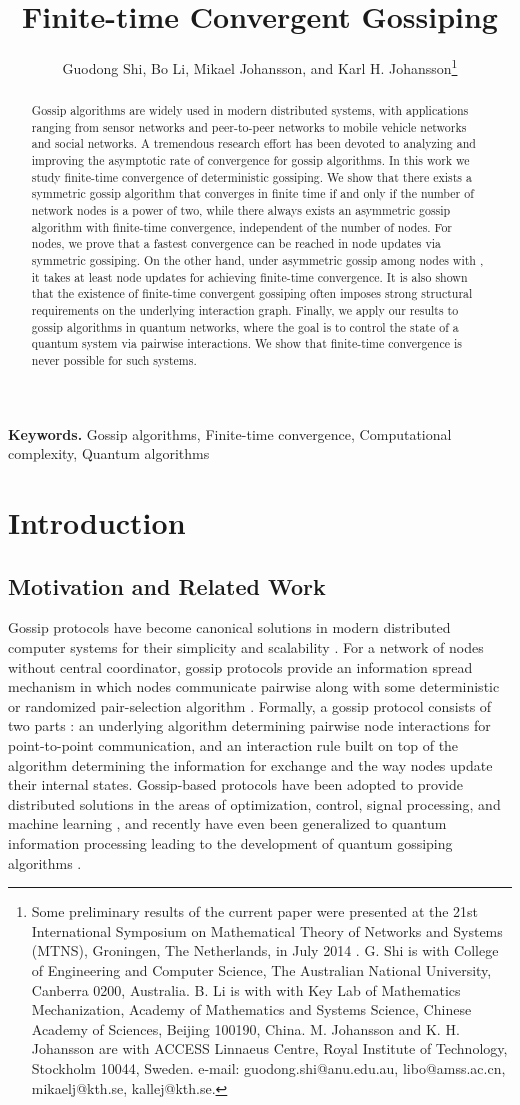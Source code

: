 \documentclass[a4paper, 11pt]{article}
\title{\bf Finite-time Convergent Gossiping}
\date{}
\author{Guodong Shi, Bo Li, Mikael  Johansson,  and Karl H. Johansson\thanks{Some preliminary results of the current paper were presented at the  21st International Symposium on Mathematical Theory of Networks and Systems (MTNS), Groningen, The Netherlands, in July 2014 \cite{MTNS}. G. Shi is with College of Engineering and Computer Science, The Australian National University, Canberra 0200, Australia. B. Li is with with Key Lab of Mathematics Mechanization, Academy of Mathematics and Systems Science, Chinese Academy of Sciences, Beijing 100190, China.   M.  Johansson and K. H. Johansson are with ACCESS Linnaeus Centre, Royal Institute of Technology, Stockholm 10044, Sweden. e-mail: guodong.shi@anu.edu.au, libo@amss.ac.cn, mikaelj@kth.se,  kallej@kth.se. }}
\begin{document}
\maketitle

\begin{abstract}
Gossip algorithms are widely used in modern distributed systems, with applications ranging from sensor networks and peer-to-peer networks to mobile vehicle networks and social networks. A tremendous research effort has been devoted to analyzing and improving the asymptotic rate of convergence for gossip algorithms. In this work we study finite-time convergence of deterministic gossiping. We show that there exists a symmetric gossip algorithm that converges in finite time if and only if the number of network nodes is a power of two, while there always exists an asymmetric gossip algorithm with  finite-time convergence, independent of the number of nodes. For  nodes, we prove that a fastest convergence can be reached in  node updates via symmetric gossiping. On the other hand, under asymmetric gossip among  nodes with , it takes at least  node updates for achieving finite-time convergence. It is also shown that the existence of  finite-time convergent gossiping often imposes strong structural requirements on the underlying interaction graph. Finally, we apply our results to gossip algorithms in quantum networks, where the goal is to control the state of a quantum system via pairwise interactions. We show that finite-time convergence is never possible for such systems.
\end{abstract}


{\bf Keywords.} Gossip algorithms, Finite-time convergence, Computational complexity, Quantum algorithms




\section{Introduction}\label{Sec:Introduction}
\subsection{Motivation and Related Work}
Gossip protocols have become canonical solutions in modern distributed computer systems for their simplicity and scalability \cite{Eugster2003,Jelasity2005,Shah2008}. For a network of nodes without central coordinator, gossip protocols provide an information spread mechanism in which nodes communicate pairwise along with some deterministic or randomized pair-selection algorithm \cite{Demers1987}. Formally, a gossip protocol consists of two parts \cite{Kempe2004}: an underlying  algorithm determining pairwise node interactions for point-to-point  communication, and an interaction rule built on top of the algorithm determining  the information for exchange  and the way nodes update their internal states. Gossip-based  protocols have  been adopted  to provide distributed solutions in the areas of optimization, control, signal processing, and machine learning \cite{Nedic2010,Bullo 2012,Moura2010,Rabbat2013}, {  and recently  have even been generalized to quantum information processing leading to the development of quantum gossiping algorithms \cite{Mazzarella2013a,Mazzarella2013b}.}
\end{document}
